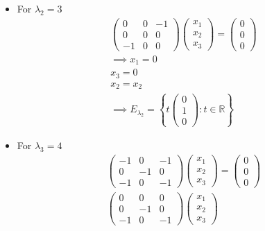 \begin{enumerate}
\begin{itemize}
\begin{gather}
\begin{pmatrix}
1\\0\\1
\end{pmatrix}\colon t \in \mathbb{R}
\right\}
\end{gather}
\item For $\lambda_2 = 3$
\begin{gather}
\begin{pmatrix}
0 & 0 & -1\\
0 & 0 & 0\\
-1 & 0 & 0
\end{pmatrix}
\begin{pmatrix}
x_1\\x_2\\x_3
\end{pmatrix}
=
\begin{pmatrix}
0\\0\\0
\end{pmatrix}\\
\implies x_1=0\\
x_3 = 0\\
x_2 = x_2\\
\implies E_{\lambda_2} =\left\{
t\begin{pmatrix}
0\\1\\0
\end{pmatrix}\colon t \in \mathbb{R}
\right\}
\end{gather}
\item For $\lambda_3 = 4$
\begin{gather}
\begin{pmatrix}
-1 & 0 & -1\\
0 & -1 & 0\\
-1 & 0 & -1
\end{pmatrix}
\begin{pmatrix}
x_1\\x_2\\x_3
\end{pmatrix}
=
\begin{pmatrix}
0\\0\\0
\end{pmatrix}\\
\begin{pmatrix}
0 & 0 & 0\\
0 & -1 & 0\\
-1 & 0 & -1
\end{pmatrix}
\begin{pmatrix}
x_1\\x_2\\x_3

\end{pmatrix}
\end{gather}
\end{itemize}
\end{enumerate}
